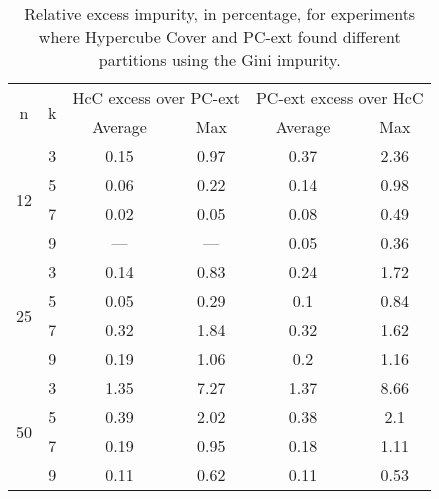 \begin{table}
\centering
\begin{tabular}{c|c|c|c|c|c} 
\multirow{2}{*}{n}   & \multirow{2}{*}{k}  &   \multicolumn{2}{c|}{HcC excess over PC-ext} &  \multicolumn{2}{c}{PC-ext excess over HcC}   \\
                     &                     &   Average           &    Max                  &   Average           &    Max                  \\
\hline
\multirow{4}{*}{12}  &    3                &   0.15              &   0.97                  &   0.37              &  2.36                   \\
                     &    5                &   0.06              &   0.22                  &   0.14              &  0.98                   \\
                     &    7                &   0.02              &   0.05                  &   0.08              &  0.49                   \\
                     &    9                &   ---               &   ---                   &   0.05              &  0.36                   \\
\hline
\multirow{4}{*}{25}  &    3                &   0.14              &   0.83                  &   0.24              &  1.72                   \\
                     &    5                &   0.05              &   0.29                  &   0.1               &  0.84                   \\
                     &    7                &   0.32              &   1.84                  &   0.32              &  1.62                   \\
                     &    9                &   0.19              &   1.06                  &   0.2               &  1.16                   \\
\hline
\multirow{4}{*}{50}  &    3                &   1.35              &   7.27                  &   1.37              &  8.66                   \\
                     &    5                &   0.39              &   2.02                  &   0.38              &  2.1                    \\
                     &    7                &   0.19              &   0.95                  &   0.18              &  1.11                   \\
                     &    9                &   0.11              &   0.62                  &   0.11              &  0.53
\end{tabular}
\caption{Relative excess impurity, in percentage, for experiments where Hypercube Cover and PC-ext found different partitions using the Gini impurity.}
\label{tab:Relative-Excess-Gini}
\end{table}


